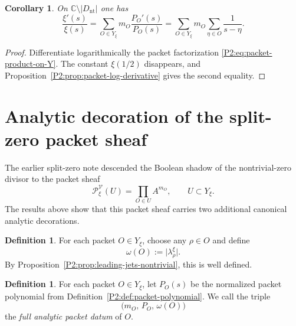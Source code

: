 \documentclass[11pt,a4paper]{article}
\numberwithin{equation}{section}
\newtheorem{corollary}[theorem]{Corollary}
\theoremstyle{definition}
\newtheorem{definition}[theorem]{Definition}
\theoremstyle{remark}
\newcommand{\CC}{\mathbb C}
\newcommand{\cV}{\mathcal V}
\begin{document}
\begin{corollary}\label{P2:cor:xi-log-derivative-packet}
On $\CC\setminus |D_{\mathrm{nt}}|$ one has
\begin{equation}\label{P2:eq:xi-log-derivative-packet}
\frac{\xi'(s)}{\xi(s)}=\sum_{O\in Y_\xi} m_O\frac{P_O'(s)}{P_O(s)}
=\sum_{O\in Y_\xi} m_O\sum_{\eta\in O}\frac{1}{s-\eta}.
\end{equation}
\end{corollary}

\begin{proof}
Differentiate logarithmically the packet factorization \eqref{P2:eq:packet-product-on-Y}.  The constant $\xi(1/2)$ disappears, and Proposition~\ref{P2:prop:packet-log-derivative} gives the second equality.
\end{proof}

\section{Analytic decoration of the split-zero packet sheaf}

The earlier split-zero note descended the Boolean shadow of the nontrivial-zero divisor to the packet sheaf
\[
\mathcal P_\xi^{\cV}(U)=\prod_{O\in U} A^{m_O},
\qquad U\subset Y_\xi.
\]
The results above show that this packet sheaf carries two additional canonical analytic decorations.

\begin{definition}
For each packet $O\in Y_\xi$, choose any $\rho\in O$ and define
\[
\omega(O):=\bigl|\lambda_\rho^{\xi}\bigr|.
\]
By Proposition~\ref{P2:prop:leading-jets-nontrivial}, this is well defined.
\end{definition}

\begin{definition}
For each packet $O\in Y_\xi$, let $P_O(s)$ be the normalized packet polynomial from Definition~\ref{P2:def:packet-polynomial}.  We call the triple
\begin{equation}\label{P2:eq:analytic-packet-data}
\bigl(m_O,\,P_O,\,\omega(O)\bigr)
\end{equation}
the \emph{full analytic packet datum} of $O$.
\end{definition}
\end{document}
